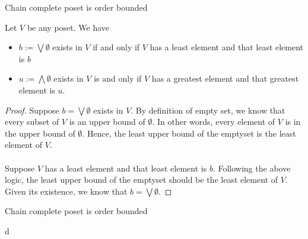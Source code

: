 \begin{frame}{Chain complete poset is order bounded}

\begin{lemma}
    Let $V$ be any poset. We have
    \begin{itemize}
        \item $b:= \bigvee \emptyset$ exists in $V$ if and only if $V$ has a least element and that least element is $b$
        \item $u:= \bigwedge \emptyset$ exists in $V$ is and only if $V$ has a greatest element and that greatest element is $u$.
    \end{itemize}
\end{lemma}
    \begin{proof}
        Suppose $b=\bigvee\emptyset$ exists in $V$. By definition of empty set, we know that every subset of $V$ is an upper bound of $\emptyset$. In other words, every element of $V$ is in the upper bound of $\emptyset$. Hence, the least upper bound of the emptyset is the least element of $V$.\\
        \\
        Suppose $V$ has a least element and that least element is $b$. Following the above logic, the least upper bound of the emptyset should be the least element of $V$. Given its existence, we know that $b=\bigvee\emptyset$.
    \end{proof}
\end{frame}

\begin{frame}{Chain complete poset is order bounded}
\begin{lemma}
    d
\end{lemma}
    
\end{frame}
